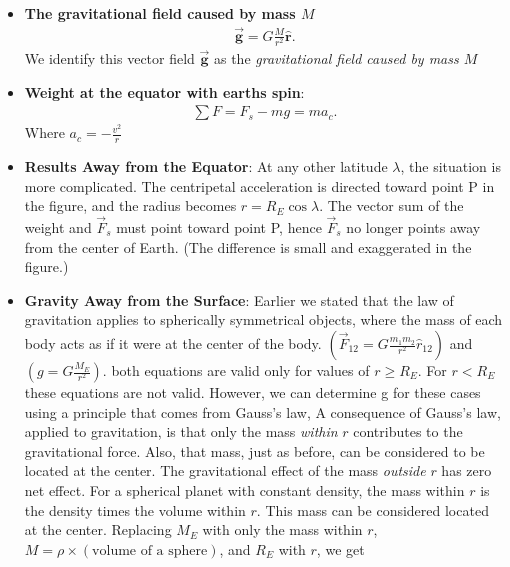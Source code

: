 \documentclass{report}
\begin{document}
\begin{itemize}
        \item \textbf{The gravitational field caused by mass $M$}
            \begin{align*}
                \vec{\mathbf{g}} = G \frac{M}{r^{2}}\hat{\mathbf{r}}
            .\end{align*}
            \bigbreak \noindent 
            We identify this vector field $\vec{\mathbf{g}}$ as the \textit{gravitational field caused by mass $M$}
        \item \textbf{Weight at the equator with earths spin}:
            \begin{align*}
                \sum F = F_{s} -mg = ma_{c}
            .\end{align*}
            Where $a_{c} = -\frac{v^{2}}{r} $
        \item \textbf{Results Away from the Equator}:
            At any other latitude $\lambda$, the situation is more complicated. The centripetal acceleration is directed toward point P in the figure, and the radius becomes $r = R_E \cos \lambda$. The vector sum of the weight and $\vec{F}_s$ must point toward point P, hence $\vec{F}_s$ no longer points away from the center of Earth. (The difference is small and exaggerated in the figure.)
            \bigbreak \noindent
        \item \textbf{Gravity Away from the Surface}: Earlier we stated that the law of gravitation applies to spherically symmetrical objects, where the mass of each body acts as if it were at the center of the body. $\left(\vec{F}_{12} = G \frac{m_1 m_2}{r^2} \hat{r}_{12}\right)$ and $\left(g = G \frac{M_E}{r^2}\right) $. 
            \bigbreak \noindent 
            both equations are valid only for values of $r \geq R_{E}$. For $r < R_{E}$ these equations are not valid. However, we can determine g for these cases using a principle that comes from Gauss’s law,
            \bigbreak \noindent 
            A consequence of Gauss’s law, applied to gravitation, is that only the mass \textit{within} $r$ contributes to the gravitational force. Also, that mass, just as before, can be considered to be located at the center. The gravitational effect of the mass \textit{outside} $r$ has zero net effect.
            \bigbreak \noindent 
            For a spherical planet with constant density, the mass within $r$ is the density times the volume within $r$. This mass can be considered located at the center. Replacing $M_E$ with only the mass within $r$, $M = \rho \times (\text{volume of a sphere})$, and $R_E$ with $r$, we get 

\end{itemize}
\end{document}
